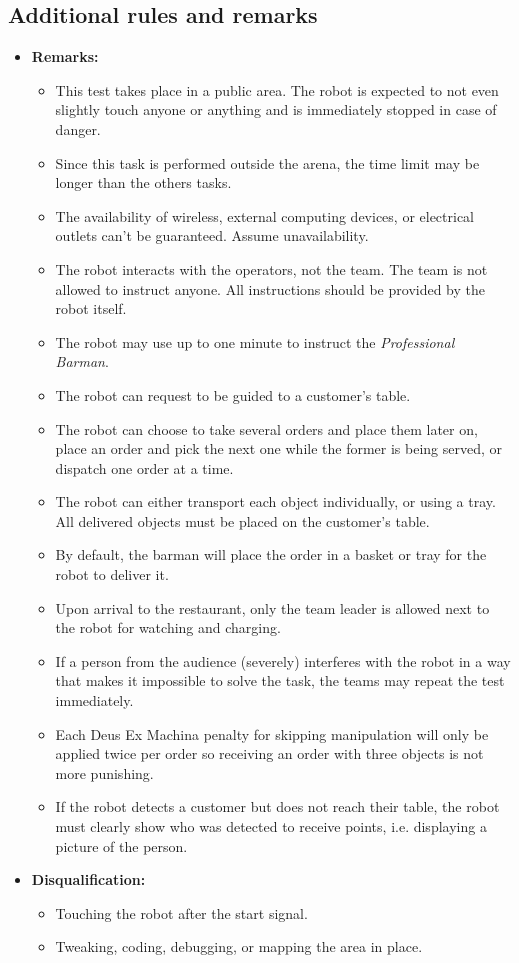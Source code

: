 \subsection*{Additional rules and remarks}
\begin{itemize}
	\item \textbf{Remarks:}
	\begin{itemize}
		\item This test takes place in a public area. The robot is expected to not even slightly touch anyone or anything and is immediately stopped in case of danger.
		\item Since this task is performed outside the arena, the time limit may be longer than the others tasks.
		\item The availability of wireless, external computing devices, or electrical outlets can't be guaranteed. Assume unavailability.
		\item The robot interacts with the operators, not the team. The team is not allowed to instruct anyone. All instructions should be provided by the robot itself.
		\item The robot may use up to one minute to instruct the \textit{Professional Barman}.
		\item The robot can request to be guided to a customer's table.
		\item The robot can choose to take several orders and place them later on, place an order and pick the next one while the former is being served, or dispatch one order at a time.
		\item The robot can either transport each object individually, or using a tray. All delivered objects must be placed on the customer's table.
		\item By default, the barman will place the order in a basket or tray for the robot to deliver it.
		\item Upon arrival to the restaurant, only the team leader is allowed next to the robot for watching and charging.
		\item If a person from the audience (severely) interferes with the robot in a way that makes it impossible to solve the task, the teams may repeat the test immediately.
		\item Each Deus Ex Machina penalty for skipping manipulation will only be applied twice per order so receiving an order with three objects is not more punishing.
		\item If the robot detects a customer but does not reach their table, the robot must clearly show who was detected to receive points, i.e. displaying a picture of the person.
	\end{itemize}
	\item \textbf{Disqualification:}
	\begin{itemize}
		\item Touching the robot after the start signal.
		\item Tweaking, coding, debugging, or mapping the area in place.
	\end{itemize}
\end{itemize}

